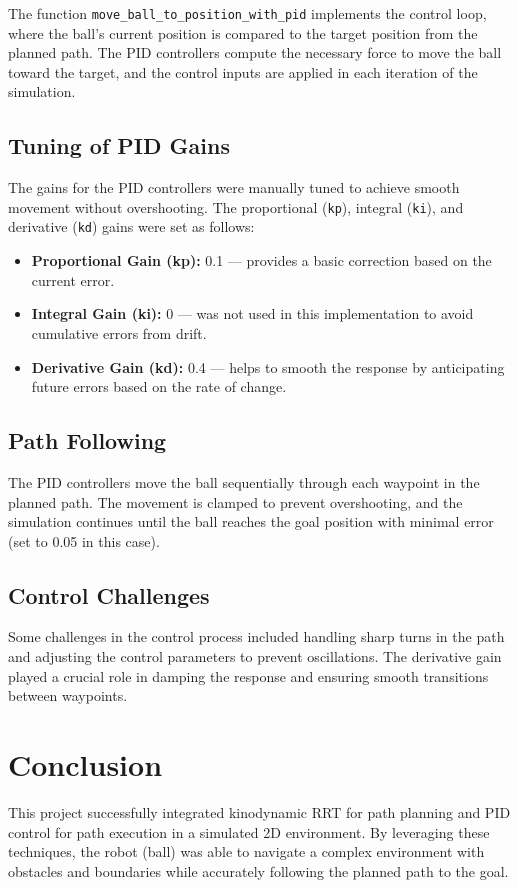 \documentclass[12pt]{article}
\begin{document}
The function \texttt{move\_ball\_to\_position\_with\_pid} implements the control loop, where the ball’s current position is compared to the target position from the planned path. The PID controllers compute the necessary force to move the ball toward the target, and the control inputs are applied in each iteration of the simulation.

\subsection{Tuning of PID Gains}
The gains for the PID controllers were manually tuned to achieve smooth movement without overshooting. The proportional (\texttt{kp}), integral (\texttt{ki}), and derivative (\texttt{kd}) gains were set as follows:
\begin{itemize}
    \item \textbf{Proportional Gain (kp):} 0.1 — provides a basic correction based on the current error.
    \item \textbf{Integral Gain (ki):} 0 — was not used in this implementation to avoid cumulative errors from drift.
    \item \textbf{Derivative Gain (kd):} 0.4 — helps to smooth the response by anticipating future errors based on the rate of change.
\end{itemize}

\subsection{Path Following}
The PID controllers move the ball sequentially through each waypoint in the planned path. The movement is clamped to prevent overshooting, and the simulation continues until the ball reaches the goal position with minimal error (set to 0.05 in this case).

\subsection{Control Challenges}
Some challenges in the control process included handling sharp turns in the path and adjusting the control parameters to prevent oscillations. The derivative gain played a crucial role in damping the response and ensuring smooth transitions between waypoints.

\section{Conclusion}
This project successfully integrated kinodynamic RRT for path planning and PID control for path execution in a simulated 2D environment. By leveraging these techniques, the robot (ball) was able to navigate a complex environment with obstacles and boundaries while accurately following the planned path to the goal.
\end{document}
